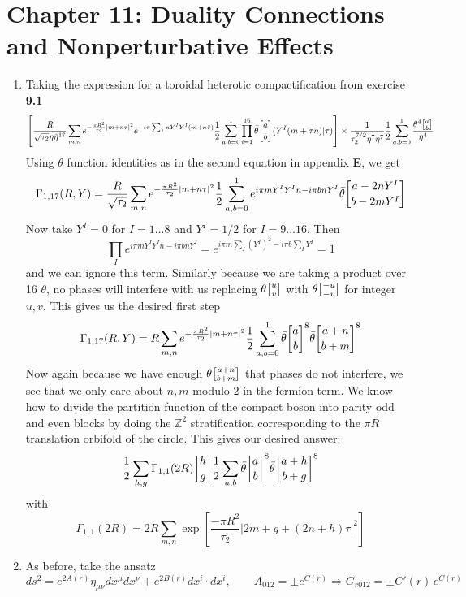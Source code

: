 \documentclass[11pt, class=article, crop=false]{standalone}
\begin{document}
\section*{Chapter 11: Duality Connections and Nonperturbative Effects} %
\label{sec:chapter_11_duality_connections_and_nonperturbative_effects}
\begin{enumerate}
	\item Taking the expression for a toroidal heterotic compactification from exercise \textbf{9.1} 
	\[
		\left[\frac{R}{\sqrt{\tau_2} \eta \bar \eta^{17}} \sum_{m,n} e^{-\frac{\pi R^2}{\tau_2} |m + n \tau|^2} e^{-i \pi \sum_I n Y^I Y^I (m + n \bar \tau)}\frac12 \sum_{a,b=0}^1  \prod_{i=1}^{16} \bar \theta \twist ab (Y^I (m + \bar \tau n) | \bar \tau) \right] \times \frac{1}{\tau_2^{7/2} \eta^7 \bar \eta^7} \frac12 \sum_{a,b = 0}^1 \frac{\theta^4 \twist a b}{\eta^4}
	\]
	Using $\theta$ function identities as in the second equation in appendix \textbf{E}, we get
	\[
		\Gamma_{1,17}(R, Y) = \frac{R}{\sqrt{\tau_2}} \sum_{m,n} e^{-\frac{\pi R^2}{\tau_2} |m + n \tau|^2} \frac12 \sum_{a,b=0}^1 e^{i \pi m Y^I Y^I n - i \pi b n Y^I} \bar \theta \twist{a - 2n Y^I}{b - 2m Y^I}
	\]
	Now take $Y^I = 0$ for $I = 1 \dots 8$ and $Y^I = 1/2$ for $I = 9 \dots 16$. Then
	\[
		\prod_I e^{i \pi m Y^I Y^I n - i \pi b n Y^I}  = e^{i \pi m \sum_I (Y^I)^2 - i \pi b \sum_I Y^I} = 1
	\]
	and we can ignore this term. Similarly because we are taking a product over 16 $\bar \theta$, no phases will interfere with us replacing $\theta\twist uv$ with $\theta \twist{-u}{-v}$ for integer $u, v$. This gives us the desired first step
	\[
		\Gamma_{1,17}(R, Y) = R \sum_{m,n} e^{-\frac{\pi R^2}{\tau_2} |m + n \tau|^2} \frac12 \sum_{a,b=0}^1 \bar \theta \twist ab^8 \bar \theta \twist{a+n}{b+m}^8
	\]
	Now again because we have enough $\theta \twist{a+n}{b+m}$ that phases do not interfere, we see that we only care about $n,m$ modulo $2$ in the fermion term. We know how to divide the partition function of the compact boson into parity odd and even blocks by doing the $\mathbb Z^2$ stratification corresponding to the $\pi R$ translation orbifold of the circle. This gives our desired answer:
	\[
		\frac12 \sum_{h,g} \Gamma_{1,1}(2R) \twist hg \frac12 \sum_{a,b} \bar \theta \twist ab^8 \bar \theta \twist{a+h}{b+g}^8
	\]
	with 
	\[
		\Gamma_{1,1} (2R) = 2R \sum_{m,n} \exp\left[\frac{-\pi R^2}{\tau_2} |2m + g + (2n + h)\tau|^2 \right]
	\]
	
	\item As before, take the ansatz
	\[
		ds^2 = e^{2A(r)} \eta_{\mu \nu} dx^\mu dx^\nu + e^{2B(r)} dx^i \cdot dx^i, \qquad A_{012} = \pm e^{C(r)} \Rightarrow G_{r 012} = \pm C'(r)\, e^{C(r)}
	\]
	

\end{enumerate}
\end{document}
